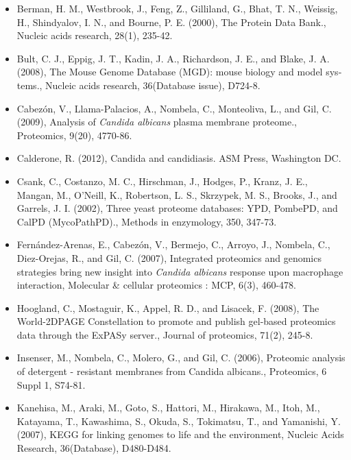 \begin{otherlanguage}{british}
\begin{itemize}[leftmargin=*]
\item[]{
Berman, H. M., Westbrook, J., Feng, Z., Gilliland, G., Bhat, T. N., Weissig, H., Shindyalov, I. N.,
and Bourne, P. E. (2000), The Protein Data Bank., Nucleic acids research, 28(1), 235-42.
}

\item[]{
Bult, C. J., Eppig, J. T., Kadin, J. A., Richardson, J. E., and Blake, J. A. (2008), The Mouse
Genome Database (MGD): mouse biology and model systems., Nucleic acids research,
36(Database issue), D724-8.
}

\item[]{
Cabez\'on, V., Llama-Palacios, A., Nombela, C., Monteoliva, L., and Gil, C. (2009), Analysis of
\textit{Candida albicans} plasma membrane proteome., Proteomics, 9(20), 4770-86.
}

\item[]{
Calderone, R. (2012), Candida and candidiasis. ASM Press, Washington DC.
}

\item[]{
Csank, C., Costanzo, M. C., Hirschman, J., Hodges, P., Kranz, J. E., Mangan, M., O'Neill,
K., Robertson, L. S., Skrzypek, M. S., Brooks, J., and Garrels, J. I. (2002), Three yeast
proteome databases: YPD, PombePD, and CalPD (MycoPathPD)., Methods in enzymology,
350, 347-73.
}

\item[]{
Fern\'andez-Arenas, E., Cabez\'on, V., Bermejo, C., Arroyo, J., Nombela, C., Diez-Orejas, R.,
and Gil, C. (2007), Integrated proteomics and genomics strategies bring new insight into
\textit{Candida albicans} response upon macrophage interaction, Molecular \& cellular proteomics
: MCP, 6(3), 460-478.
}

\item[]{
Hoogland, C., Mostaguir, K., Appel, R. D., and Lisacek, F. (2008), The World-2DPAGE 
Constellation to promote and publish gel-based proteomics data through the ExPASy server.,
Journal of proteomics, 71(2), 245-8.
}

\item[]{
Insenser, M., Nombela, C., Molero, G., and Gil, C. (2006), Proteomic analysis of detergent -
resistant membranes from Candida albicans., Proteomics, 6 Suppl 1, S74-81.
}

\item[]{
Kanehisa, M., Araki, M., Goto, S., Hattori, M., Hirakawa, M., Itoh, M., Katayama, T., 
Kawashima, S., Okuda, S., Tokimatsu, T., and Yamanishi, Y. (2007), KEGG for linking genomes to
life and the environment, Nucleic Acids Research, 36(Database), D480-D484.
}


\end{itemize}
\end{otherlanguage}
